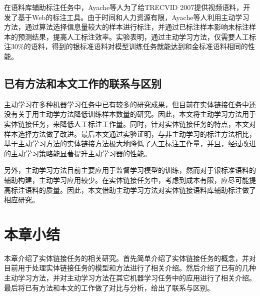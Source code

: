 在语料库辅助标注任务中，Ayache等人\cite{ayache2008video}为了给TRECVID 2007提供视频语料，开发了基于Web的标注工具。由于时间和人力资源有限，Ayache等人利用主动学习方法，通过算法选择信息量较大的样本进行标注，并通过已标注样本影响未标注样本的预测结果，提高人工标注效率。实验表明，通过主动学习方法，仅需要人工标注30\%的语料，得到的银标准语料对模型训练任务就能达到和金标准语料相同的性能。

\subsection{已有方法和本文工作的联系与区别}
主动学习在多种机器学习任务中已有较多的研究成果，但目前在实体链接任务中还没有关于用主动学方法降低训练样本数量的研究。因此，本文将主动学习方法用于实体链接任务，来降低人工标注工作量。同时，针对实体链接任务的特点，本文对样本选择方法做了改进。最后本文通过实验证明，与非主动学习的标注方法相比，基于主动学习方法的实体链接方法极大地降低了人工标注工作量，并且，经过改进的主动学习策略能显著提升主动学习器的性能。

另外，主动学习方法目前主要应用于监督学习模型的训练，然而对于银标准语料的辅助构建，主动学习应用较少。在实体链接任务中，考虑到成本有限，应尽可能提高标注语料的质量。因此，本文借助主动学习方法对实体链接语料库辅助标注做了相应研究。

\section{本章小结}
本章介绍了实体链接任务的相关研究。首先简单介绍了实体链接任务的概念，并对目前用于处理实体链接任务的模型和方法进行了相关介绍。然后介绍了已有的几种主动学习方法，并对主动学习方法在其它机器学习任务中的应用进行了相关介绍。最后将已有方法和本文的工作做了对比与分析，给出了联系与区别。